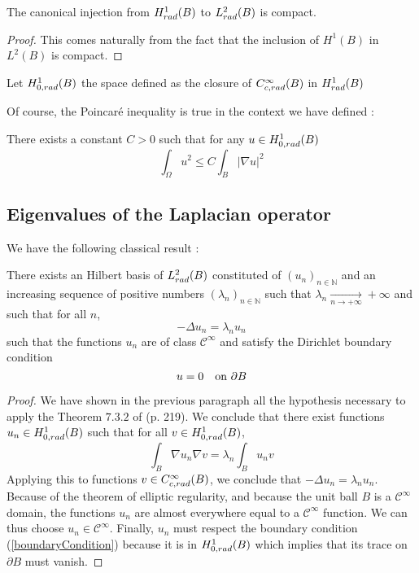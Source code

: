 \documentclass[11pt,a4paper]{article}
\begin{document}
\begin{Prop} The canonical injection from $H^1_{rad}(B)$ to $L^2_{rad}(B)$ is compact. 
\begin{proof}
This comes naturally from the fact that the inclusion of $H^1(B)$ in $L^2(B)$ is compact. 
\end{proof}
\end{Prop}

\begin{Def} Let $H^1_{0,rad}(B)$ the space defined as the closure of $C^\infty_{c,rad}(B)$ in $H^1_{rad}(B)$
\end{Def}

Of course, the Poincaré inequality is true in the context we have defined : 
\begin{Prop} There exists a constant $C>0$ such that for any $u \in H^1_{0,rad}(B)$
\[  \int_{\Omega} u^2 \leq C\int_{B} |\nabla u|^2 \]
\end{Prop}

\subsection{Eigenvalues of the Laplacian operator}

We have the following classical result :  
\begin{The} There exists an Hilbert basis of $L^2_{rad}(B)$ constituted of $(u_n)_{n\in \mathbb{N}}$ and an increasing sequence of positive numbers $(\lambda_n)_{n\in \mathbb{N}}$  such that $\lambda_n \underset{n \to +\infty}{\longrightarrow} +\infty$ and such that for all $n$, \[- \Delta u_n = \lambda_n u_n\] such that the functions $u_n$ are of class $\mathcal{C}^{\infty}$ and satisfy the Dirichlet boundary condition 
\label{TheoAllaire}
\begin{equation}
u = 0 \quad \textup{on } \partial B
\label{boundaryCondition}
\end{equation}
\begin{proof}
We have shown in the previous paragraph all the hypothesis necessary to apply the Theorem $7.3.2$ of \cite{allaire2005analyse} (p. 219). We conclude that there exist functions $u_n \in H^1_{0,rad}(B)$ such that for all $v \in H^1_{0,rad}(B)$, 
\begin{equation}
\int_{B} \nabla u_n  \nabla v = \lambda_n \int_{B} u_n v
\label{formVarLocal}
\end{equation}
Applying this to functions $v\in C^\infty_{c,rad}(B)$, we conclude that $-\Delta u_n = \lambda_n u_n$. Because of the theorem of elliptic regularity, and because the unit ball $B$ is a $\mathcal{C}^\infty$ domain, the functions $u_n$ are almost everywhere equal to a $\mathcal{C}^\infty$ function. We can thus choose $u_n \in \mathcal{C}^\infty$. Finally, $u_n$ must respect the boundary condition (\ref{boundaryCondition}) because it is in $H^1_{0,rad}(B)$ which implies that its trace on $\partial B$ must vanish. 
\end{proof}
\end{The}
\end{document}
